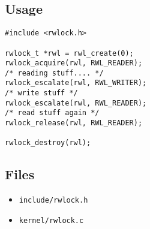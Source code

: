 \subsection{Usage}
\begin{lstlisting}
#include <rwlock.h>

rwlock_t *rwl = rwl_create(0);
rwlock_acquire(rwl, RWL_READER);
/* reading stuff.... */
rwlock_escalate(rwl, RWL_WRITER);
/* write stuff */
rwlock_escalate(rwl, RWL_READER);
/* read stuff again */
rwlock_release(rwl, RWL_READER);

rwlock_destroy(rwl);
\end{lstlisting}
\subsection{Files}
\begin{itemize}
\item \texttt{include/rwlock.h}
\item \texttt{kernel/rwlock.c}
\end{itemize}
